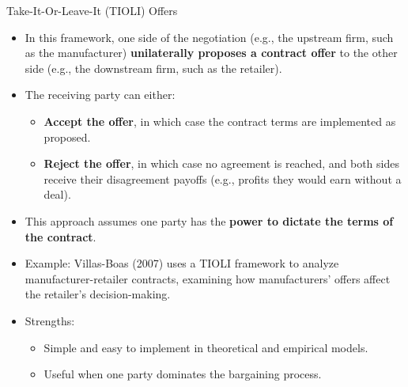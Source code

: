 \documentclass[aspectratio=169]{beamer}  %
\begin{document}
\begin{frame}{Take-It-Or-Leave-It (TIOLI) Offers}
\begin{itemize}
    \item In this framework, one side of the negotiation (e.g., the upstream firm, such as the manufacturer) \textbf{unilaterally proposes a contract offer} to the other side (e.g., the downstream firm, such as the retailer).
    \item The receiving party can either:
    \begin{itemize}
        \item \textbf{Accept the offer}, in which case the contract terms are implemented as proposed.
        \item \textbf{Reject the offer}, in which case no agreement is reached, and both sides receive their disagreement payoffs (e.g., profits they would earn without a deal).
    \end{itemize}
    \item This approach assumes one party has the \textbf{power to dictate the terms of the contract}.
    \item Example: Villas-Boas (2007) uses a TIOLI framework to analyze manufacturer-retailer contracts, examining how manufacturers' offers affect the retailer's decision-making.
    \item Strengths:
    \begin{itemize}
        \item Simple and easy to implement in theoretical and empirical models.
        \item Useful when one party dominates the bargaining process.
    \end{itemize}
\end{itemize}
\end{frame}
\end{document}
